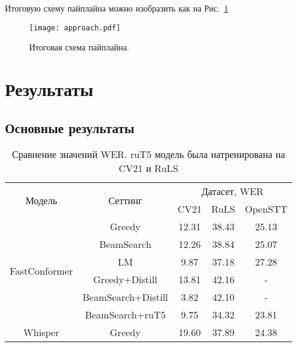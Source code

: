 Итоговую схему пайплайна можно изобразить как на Рис.~\ref{fig:approach}

\begin{figure}[!t]
  \centering
  \texttt{[image: approach.pdf]}
  \caption{Итоговая схема пайплайна.}
  \label{fig:approach}
\end{figure}

\section{Результаты}
\subsection{Основные результаты}
\begin{table}[]
\centering
\caption{Сравнение значений WER. ruT5 модель была натренирована на CV21 и RuLS}
\begin{tabular}{|c|c|ccc|}
\hline
\multirow{2}{*}{Модель}        & \multirow{2}{*}{Сеттинг}             & \multicolumn{3}{c|}{Датасет, WER}                                    \\ \cline{3-5} 
                               &                                      & \multicolumn{1}{c|}{CV21}  & \multicolumn{1}{c|}{RuLS}     & OpenSTT \\ \hline
\multirow{6}{*}{FastConformer} & Greedy                               & \multicolumn{1}{c|}{12.31} & \multicolumn{1}{c|}{38.43}    & 25.13   \\ \cline{2-5} 
                               & BeamSearch                           & \multicolumn{1}{c|}{12.26} & \multicolumn{1}{c|}{38.84}    & 25.07   \\ \cline{2-5} 
                               & LM                                   & \multicolumn{1}{c|}{9.87}  & \multicolumn{1}{c|}{37.18}    & 27.28   \\ \cline{2-5} 
                               & Greedy+Distill                       & \multicolumn{1}{c|}{13.81} & \multicolumn{1}{c|}{42.16}    & -       \\ \cline{2-5} 
                               & BeamSearch+Distill                   & \multicolumn{1}{c|}{3.82}  & \multicolumn{1}{c|}{42.10}    & -       \\ \cline{2-5} 
                               & BeamSearch+ruT5                      & \multicolumn{1}{c|}{9.75}  & \multicolumn{1}{c|}{34.32}    & 23.81   \\ \hline
\multirow{4}{*}{Whisper}       & Greedy                               & \multicolumn{1}{c|}{19.60} & \multicolumn{1}{c|}{37.89}    & 24.38   \\ \cline{2-5} 

\end{tabular}
\end{table}

